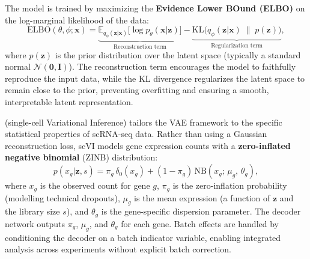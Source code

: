 The model is trained by maximizing the \textbf{Evidence Lower BOund (ELBO)} on the log-marginal likelihood of the data:
\begin{equation}
  \text{ELBO}(\theta, \phi; \mathbf{x}) = \underbrace{\mathbb{E}_{q_\phi(\mathbf{z}|\mathbf{x})}\bigl[\log p_\theta(\mathbf{x} | \mathbf{z})\bigr]}_{\text{Reconstruction term}} - \underbrace{\text{KL}\bigl(q_\phi(\mathbf{z}|\mathbf{x}) \;\|\; p(\mathbf{z})\bigr)}_{\text{Regularization term}},
  \label{eq:multiomics:elbo}
\end{equation}
where $p(\mathbf{z})$ is the prior distribution over the latent space (typically a standard normal $\mathcal{N}(\mathbf{0}, \mathbf{I})$). The reconstruction term encourages the model to faithfully reproduce the input data, while the KL divergence regularizes the latent space to remain close to the prior, preventing overfitting and ensuring a smooth, interpretable latent representation.

\begin{keyconcept}[title={scVI: Modelling Count Data with ZINB Likelihood}]
 (single-cell Variational Inference) tailors the VAE framework to the specific statistical properties of scRNA-seq data. Rather than using a Gaussian reconstruction loss, scVI models gene expression counts with a \textbf{zero-inflated negative binomial} (ZINB) distribution:
\begin{equation}
  p(x_g | \mathbf{z}, s) = \pi_g \,\delta_0(x_g) + (1 - \pi_g)\,\text{NB}(x_g;\, \mu_g,\, \theta_g),
  \label{eq:multiomics:zinb}
\end{equation}
where $x_g$ is the observed count for gene $g$, $\pi_g$ is the zero-inflation probability (modelling technical dropouts), $\mu_g$ is the mean expression (a function of $\mathbf{z}$ and the library size $s$), and $\theta_g$ is the gene-specific dispersion parameter. The decoder network outputs $\pi_g$, $\mu_g$, and $\theta_g$ for each gene. Batch effects are handled by conditioning the decoder on a batch indicator variable, enabling integrated analysis across experiments without explicit batch correction.
\end{keyconcept}

